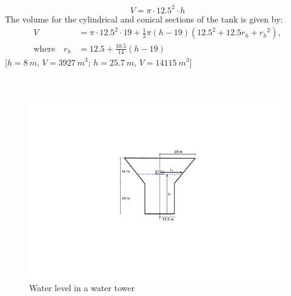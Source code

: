 {\begin{minipage}{\linewidth}
\begin{equation*}
V = \pi \cdot 12.5^2 \cdot h
\end{equation*}
The volume for the cylindrical and conical sections of the tank is given by:
\begin{align*}
V &= \pi \cdot 12.5^2 \cdot 19 + \frac{1}{3}\pi (h - 19)(12.5^2 + 12.5r_h + {r_h}^2), \\
\textrm{where} \quad r_h &= 12.5 + \frac{10.5}{14} (h - 19)
\end{align*}
[$h = 8~m$, $V = 3927~m^3$; $h = 25.7~m$, $V = 14115~m^3$]
\end{minipage}%
}\\
\addtolength{\parindent}{4mm}
\begin{figure}[h]
	\myfloatalign
	\includegraphics[width=0.65\linewidth]{Graphics/Additional-Ex/water-tower}
	\caption{Water level in a water tower}
	\label{fig:water-tower}
\end{figure}

